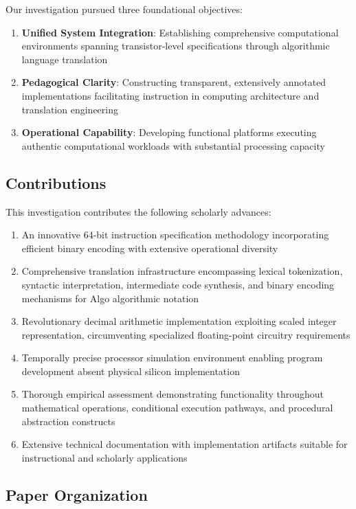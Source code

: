 \documentclass[conference,10pt,twocolumn]{IEEEtran}
\begin{document}
Our investigation pursued three foundational objectives:

\begin{enumerate}
\item \textbf{Unified System Integration}: Establishing comprehensive computational environments spanning transistor-level specifications through algorithmic language translation
\item \textbf{Pedagogical Clarity}: Constructing transparent, extensively annotated implementations facilitating instruction in computing architecture and translation engineering
\item \textbf{Operational Capability}: Developing functional platforms executing authentic computational workloads with substantial processing capacity
\end{enumerate}

\subsection{Contributions}

This investigation contributes the following scholarly advances:

\begin{enumerate}
\item An innovative 64-bit instruction specification methodology incorporating efficient binary encoding with extensive operational diversity
\item Comprehensive translation infrastructure encompassing lexical tokenization, syntactic interpretation, intermediate code synthesis, and binary encoding mechanisms for Algo algorithmic notation
\item Revolutionary decimal arithmetic implementation exploiting scaled integer representation, circumventing specialized floating-point circuitry requirements
\item Temporally precise processor simulation environment enabling program development absent physical silicon implementation
\item Thorough empirical assessment demonstrating functionality throughout mathematical operations, conditional execution pathways, and procedural abstraction constructs
\item Extensive technical documentation with implementation artifacts suitable for instructional and scholarly applications
\end{enumerate}

\subsection{Paper Organization}
\end{document}
